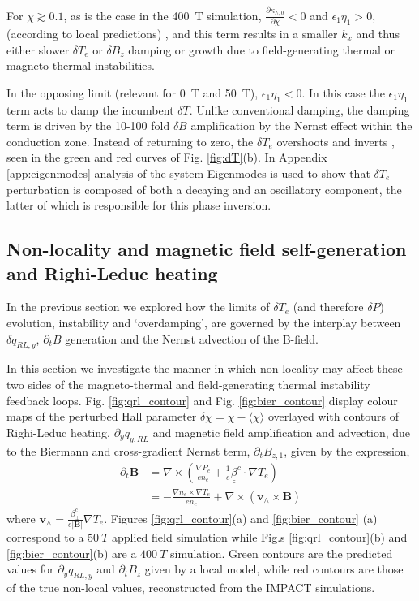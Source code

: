 \documentclass[aip,reprint]{revtex4-1}
\newcommand*{\dbul}[1]{%
	\underline{\underline{ #1}}
}
\begin{document}
 For  $\chi \gtrsim 0.1$, as is the case in the \SI{400}{T} simulation,  $\frac{\partial \kappa_{\wedge,0}}{\partial \chi}<0$ and $\epsilon_1 \eta_1>0$, (according to local predictions) \cite{Epperlein1986}, and this term results in a smaller $k_x$ and thus either slower $\delta T_e$ or $\delta B_z$ damping or growth due to field-generating thermal or magneto-thermal instabilities.

In the opposing limit (relevant for \SI{0}{T} and \SI{50}{T}), $\epsilon_1 \eta_1 < 0$. In this case the $\epsilon_1 \eta_1$ term acts to damp the incumbent $\delta T$. Unlike conventional damping, the damping term is driven by the 10-100 fold $\delta B$ amplification by the Nernst effect within the conduction zone. Instead of returning to zero, the $\delta T_e$  overshoots and inverts \cite{Hill2018}, seen in the green and red curves of Fig. \ref{fig:dT}(b).  In Appendix \ref{app:eigenmodes} analysis of the system Eigenmodes is used to show that $\delta T_e$ perturbation is composed of both a decaying and an oscillatory component, the latter of which is responsible for this phase inversion.

\subsection{Non-locality and magnetic field self-generation and Righi-Leduc heating }
\label{sec:biermann_and_qrl}
In the previous section we explored how the limits of $\delta T_e$ (and therefore $\delta P$) evolution, instability and `overdamping', are governed by the interplay between  $\delta q_{RL,y}$, $\partial_t B$ generation and the Nernst advection of the B-field. 

In this section we investigate the manner in which non-locality may affect these two sides of the magneto-thermal and field-generating thermal instability feedback loops.  Fig.  \ref{fig:qrl_contour} and Fig. \ref{fig:bier_contour} display colour maps of the perturbed Hall parameter $\delta \chi = \chi - \langle \chi \rangle$ overlayed with contours of Righi-Leduc heating, $\partial_y q_{y,RL}$ and magnetic field amplification and advection, due to the Biermann and cross-gradient Nernst term, $\partial_t B_{z,1}$,  given by the expression,
\begin{eqnarray}
\partial_t \mathbf{B} &= \nabla \times\left( \frac{\nabla P_e}{e n_e} + \frac{1}{e} \dbul{\beta}^c \cdot \nabla T_e  \right)\nonumber\\
&= - \frac{\nabla n_e \times \nabla T_e}{e n_e} + \nabla \times (\mathbf{v_{\wedge} } \times \mathbf{B})
\end{eqnarray}
where $\mathbf{v}_{\wedge} = \frac{\beta^c_{\perp}}{e |\mathbf{B}|}\nabla T_e$.  Figures \ref{fig:qrl_contour}(a) and \ref{fig:bier_contour} (a) correspond to a $\SI{50}{T}$ applied field simulation while Fig.s \ref{fig:qrl_contour}(b) and \ref{fig:bier_contour}(b) are a $\SI{400}{T}$ simulation. Green contours are the predicted values for $\partial_y q_{RL,y}$ and $\partial_t B_{z}$ given by a local model, while red contours are those of the true non-local values, reconstructed from the IMPACT simulations.
\end{document}
